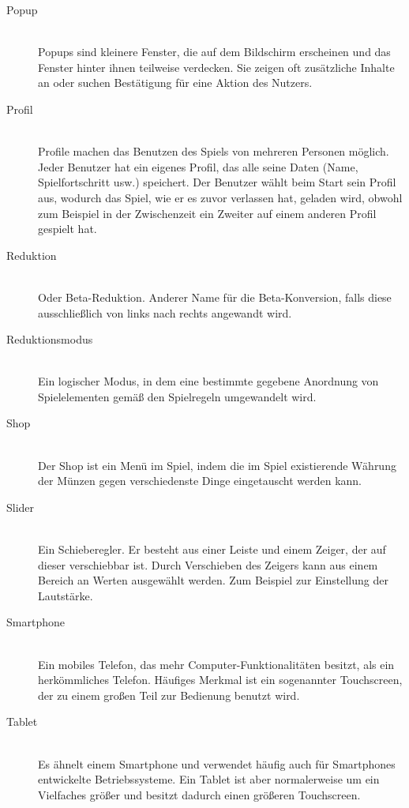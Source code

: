 \begin{description}
	\item[Popup] \hfill \\
	Popups sind kleinere Fenster, die auf dem Bildschirm erscheinen und das Fenster hinter ihnen teilweise verdecken.
	Sie zeigen oft zusätzliche Inhalte an oder suchen Bestätigung für eine Aktion des Nutzers.
	
	\item[Profil] \hfill \\
	Profile machen das Benutzen des Spiels von mehreren Personen möglich. Jeder Benutzer hat ein eigenes Profil,
	das alle seine Daten (Name, Spielfortschritt usw.) speichert. Der Benutzer wählt beim Start sein Profil aus, wodurch das Spiel,
	wie er es zuvor verlassen hat, geladen wird, obwohl zum Beispiel in der Zwischenzeit ein Zweiter auf einem anderen Profil gespielt hat.
	
	\item[Reduktion] \hfill \\
	Oder Beta-Reduktion. Anderer Name für die Beta-Konversion, falls diese ausschließlich von links nach rechts angewandt wird.
	
	\item[Reduktionsmodus] \hfill \\
	Ein logischer Modus, in dem eine bestimmte gegebene Anordnung von Spielelementen gemäß den Spielregeln umgewandelt wird.
	
	\item[Shop] \hfill \\
	Der Shop ist ein Menü im Spiel, indem die im Spiel existierende Währung der Münzen gegen verschiedenste Dinge eingetauscht werden kann.
	
	\item[Slider] \hfill \\
	Ein Schieberegler. Er besteht aus einer Leiste und einem Zeiger, der auf dieser verschiebbar ist. Durch Verschieben des Zeigers kann aus 
	einem Bereich an Werten ausgewählt werden. Zum Beispiel zur Einstellung der Lautstärke.
	
	\item[Smartphone] \hfill \\
	Ein mobiles Telefon, das mehr Computer-Funktionalitäten besitzt, als ein herkömmliches Telefon. Häufiges Merkmal ist ein sogenannter
	Touchscreen, der zu einem großen Teil zur Bedienung benutzt wird.
	
	\item[Tablet] \hfill \\
	Es ähnelt einem Smartphone und verwendet häufig auch für Smartphones entwickelte Betriebssysteme. 
	Ein Tablet ist aber normalerweise um ein Vielfaches größer und besitzt dadurch einen größeren Touchscreen.


\end{description}
